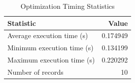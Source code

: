 
\begin{table}[h!]
\centering
\begin{tabular}{l r}
\hline
Statistic & Value \\
\hline
Average execution time (s) & 0.174949 \\
Minimum execution time (s) & 0.134199 \\
Maximum execution time (s) & 0.220292 \\
Number of records & 10 \\
\hline
\end{tabular}
\caption{Optimization Timing Statistics}
\end{table}
